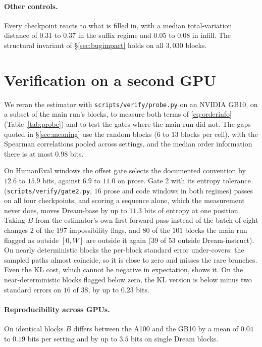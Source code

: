\documentclass{article}
\begin{document}
\paragraph{Other controls.} Every checkpoint reacts to what is filled in, with a median
total-variation distance of $0.31$ to $0.37$ in the suffix regime and $0.05$ to $0.08$
in infill. The structural invariant of \S\ref{sec:bugimpact} holds on all $3{,}030$
blocks.

\section{Verification on a second GPU}
\label{app:probe}
We reran the estimator with \texttt{scripts/verify/probe.py} on an NVIDIA GB10, on a
subset of the main run's blocks, to measure both terms of \eqref{eq:orderinfo}
(Table~\ref{tab:probe}) and to test the gates where the main run did not. The gaps quoted
in \S\ref{sec:meaning} use the random blocks ($6$ to $13$ blocks per cell), with the
Spearman correlations pooled across settings, and the median order information there is
at most $0.98$ bits.


On HumanEval windows the offset gate selects the documented convention by $12.6$ to
$15.9$ bits, against $6.9$ to $11.0$ on prose. Gate 2 with its entropy tolerance
(\texttt{scripts/verify/gate2.py}, $16$ prose and code windows in both regimes) passes on
all four checkpoints, and scoring a sequence alone, which the measurement never does,
moves Dream-base by up to $11.3$ bits of entropy at one position. Taking $B$ from the
estimator's own first forward pass instead of the batch of eight changes $2$ of the
$197$ impossibility flags, and $80$ of the $101$ blocks the main run flagged as outside
$[0,W]$ are outside it again ($39$ of $53$ outside Dream-instruct). On nearly deterministic blocks the per-block standard error under-covers: the sampled
paths almost coincide, so it is close to zero and misses the rare branches. Even the KL
cost, which cannot be negative in expectation, shows it. On the near-deterministic
blocks flagged below zero, the KL version is below minus two standard errors on $16$ of $38$, by up to $0.23$ bits.

\paragraph{Reproducibility across GPUs.} On identical blocks $B$ differs between the
A100 and the GB10 by a mean of $0.04$ to $0.19$ bits per setting and by up to $3.5$ bits
on single Dream blocks.
\end{document}
